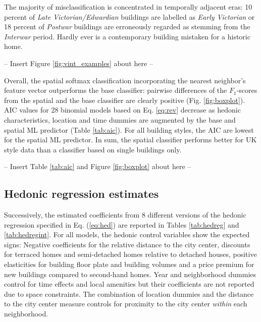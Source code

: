 \documentclass[]{article}
\begin{document}
The majority of misclassification is concentrated in temporally adjacent
eras: 10 percent of \emph{Late Victorian/Edwardian} buildings are
labelled as \emph{Early Victorian} or 18 percent of \emph{Postwar}
buildings are erroneously regarded as stemming from the \emph{Interwar}
period. Hardly ever is a contemporary building mistaken for a historic
home.

\begin{center}
  -- Insert Figure \ref{fig:vint_examples} about here --
\end{center}

Overall, the spatial softmax classification incorporating the nearest
neighbor's feature vector outperforms the base classifier: pairwise
differences of the \(F_1\)-scores from the spatial and the base
classifier are clearly positive (Fig. \ref{fig:boxplot}). AIC values for
28 binomial models based on Eq. \ref{eq:rev} decrease as hedonic
characteristics, location and time dummies are augmented by the base and
spatial ML predictor (Table \ref{tab:aic}). For all building styles, the
AIC are lowest for the spatial ML predictor. In sum, the spatial
classifier performs better for UK style data than a classifier based on
single buildings only.

\begin{center}
  -- Insert Table \ref{tab:aic} and Figure \ref{fig:boxplot} about here --
\end{center}

\hypertarget{hedonic-regression-estimates}{%
\subsection{Hedonic regression
estimates}\label{hedonic-regression-estimates}}

Successively, the estimated coefficients from 8 different versions of
the hedonic regression specified in Eq. (\ref{eq:hed}) are reported in
Tables \ref{tab:hedreg} and \ref{tab:hedregint}. For all models, the
hedonic control variables show the expected signs: Negative coefficients
for the relative distance to the city center, discounts for terraced
homes and semi-detached homes relative to detached houses, positive
elasticities for building floor plate and building volumes and a price
premium for new buildings compared to second-hand homes. Year and
neighborhood dummies control for time effects and local amenities but
their coefficients are not reported due to space constraints. The
combination of location dummies and the distance to the city center
measure controls for proximity to the city center \emph{within} each
neighborhood.
\end{document}

